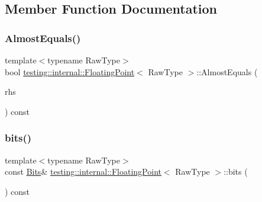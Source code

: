 \subsection{Member Function Documentation}
\mbox{\label{classtesting_1_1internal_1_1_floating_point_a965214c1af2f9ac5adb1393794aa81e5}} 
\subsubsection{\texorpdfstring{AlmostEquals()}{AlmostEquals()}}
{\footnotesize\ttfamily template$<$typename Raw\+Type$>$ \\
bool \mbox{\hyperlink{classtesting_1_1internal_1_1_floating_point}{testing\+::internal\+::\+Floating\+Point}}$<$ Raw\+Type $>$\+::Almost\+Equals (\begin{DoxyParamCaption}\item[{const \mbox{\hyperlink{classtesting_1_1internal_1_1_floating_point}{Floating\+Point}}$<$ Raw\+Type $>$ \&}]{rhs }\end{DoxyParamCaption}) const\hspace{0.3cm}{\ttfamily [inline]}}

\mbox{\label{classtesting_1_1internal_1_1_floating_point_aab053be914bdc9e507c0db89740c318c}} 
\subsubsection{\texorpdfstring{bits()}{bits()}}
{\footnotesize\ttfamily template$<$typename Raw\+Type$>$ \\
const \mbox{\hyperlink{classtesting_1_1internal_1_1_floating_point_abf228bf6cd48f12c8b44c85b4971a731}{Bits}}\& \mbox{\hyperlink{classtesting_1_1internal_1_1_floating_point}{testing\+::internal\+::\+Floating\+Point}}$<$ Raw\+Type $>$\+::bits (\begin{DoxyParamCaption}{ }\end{DoxyParamCaption}) const\hspace{0.3cm}{\ttfamily [inline]}}

